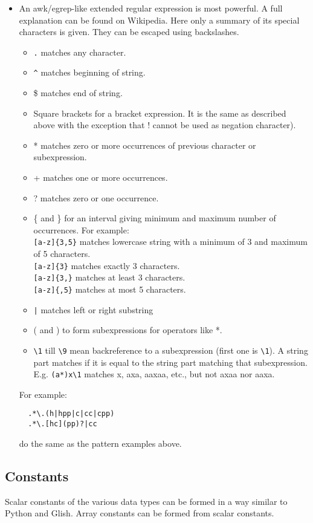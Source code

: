\begin{itemize}
\item An awk/egrep-like extended regular expression is most powerful. A
  full explanation can be found on Wikipedia. Here only a
  summary of its special characters is given. They can be escaped
  using backslashes.
  \begin{itemize}
  \item \texttt{.} matches any character.
  \item \verb+^+ matches beginning of string.
  \item \$ matches end of string.
  \item Square brackets for a bracket expression. It is the same as
    described above with the exception that ! cannot be used as negation character).
  \item * matches zero or more occurrences of previous character or subexpression.
  \item + matches one or more occurrences.
  \item ? matches zero or one occurrence.
  \item \{ and \} for an interval giving minimum and maximum number of
    occurrences. For example:
    \\\texttt{[a-z]\{3,5\}} matches lowercase string with a minimum of 3
    and maximum of 5 characters.
    \\\texttt{[a-z]\{3\}} matches exactly 3 characters.
    \\\texttt{[a-z]\{3,\}} matches at least 3 characters.
    \\\texttt{[a-z]\{,5\}} matches at most 5 characters.
  \item \verb+|+ matches left or right substring
  \item ( and ) to form subexpressions for operators like *.
  \item \verb+\1+ till \verb+\9+ mean backreference to a subexpression (first one is
    \verb+\1+). A string part matches if it is equal to the string
    part matching that subexpression.
    E.g. \verb+(a*)x\1+ matches x, axa, aaxaa, etc.,
    but not axaa nor aaxa.
  \end{itemize}
  For example:
\begin{verbatim}
  .*\.(h|hpp|c|cc|cpp)
  .*\.[hc](pp)?|cc
\end{verbatim}
  do the same as the pattern examples above.
\end{itemize}

\subsection{\label{TAQL:CONSTANTS}Constants}
Scalar constants of the various data types can be formed in a way similar
to Python and Glish. Array constants can be formed from scalar
constants.
